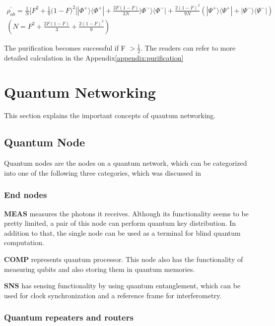 \begin{multline*}
\rho^{'}_{ab} = \frac{1}{N} \big[ F^2 + \frac{1}{9}\big(1-F \big)^2\big]|\Phi^+\rangle\langle\Phi^+| + \frac{2F(1-F)}{3N}|\Phi^-\rangle\langle\Phi^-| + \frac{2(1-F)^2}{9N}(|\Psi^+\rangle\langle\Psi^+| + |\Psi^-\rangle\langle\Psi^-|) \\
(N = F^2 + \frac{2F(1-F)}{3} + \frac{2(1-F)^2}{9})
\end{multline*}

The purification becomes successful if F  $> \frac{1}{2}$. The readers can refer to more detailed calculation in the Appendix\ref{appendix:purification}

\section{Quantum Networking}

This section explains the important concepts of quantum networking.

\subsection{Quantum Node}

Quantum nodes are the nodes on a quantum network, which can be categorized into one of the following three categories, which was discussed in \cite{van2022quantum}

\subsubsection{End nodes}

\textbf{MEAS} measures the photons it receives. Although its functionality seems to be pretty limited, a pair of this node can perform quantum key distribution. In addition to that, the single node can be used as a terminal for blind quantum computation.

\textbf{COMP} represents quantum processor.  This node also has the functionality of measuring qubits and also storing them in quantum memories.

\textbf{SNS} has sensing functionality by using quantum entanglement, which can be used for clock synchronization and a reference frame for interferometry. 

\subsubsection{Quantum repeaters and routers}

